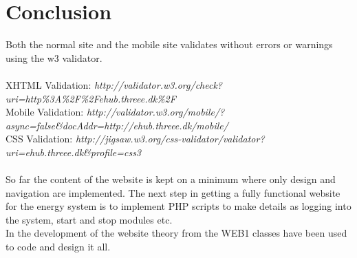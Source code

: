 \chapter{Conclusion}
Both the normal site and the mobile site validates without errors or warnings using the w3 validator. 
\\\\XHTML Validation: \textit{http://validator.w3.org/check?uri=http\%3A\%2F\%2Fehub.threee.dk\%2F}
\\Mobile Validation: \textit{http://validator.w3.org/mobile/?async=false\&docAddr=http://ehub.threee.dk/mobile/}
\\CSS Validation: \textit{http://jigsaw.w3.org/css-validator/validator?uri=ehub.threee.dk&profile=css3}
\\\\So far the content of the website is kept on a minimum where only design and navigation are implemented. The next step in getting a fully functional website for the energy system is to implement PHP scripts to make details as logging into the system, start and stop modules etc.
\\In the development of the website theory from the WEB1 classes have been used to code and design it all.
